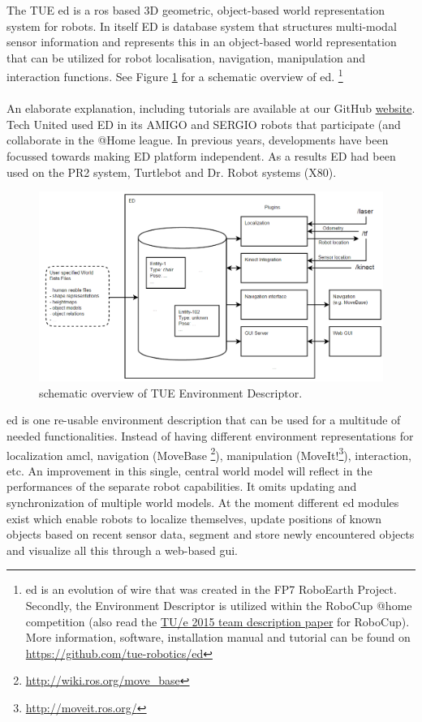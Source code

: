 The TUE \acrfull{ed} is a \acrfull{ros} based 3D geometric, object-based world representation system for robots. In itself ED is database system that structures multi-modal sensor information and represents this in an object-based world representation that can be utilized for robot localisation, navigation, manipulation and interaction functions. See Figure \ref{fig:ed} for a schematic overview of \acrshort{ed}. \footnote{\acrshort{ed} is an evolution of \acrfull{wire} that was created in the FP7 RoboEarth Project. Secondly, the Environment Descriptor is utilized within the RoboCup @home competition (also read the \href{https://github.com/tue-robotics/team_description_paper/blob/master/Tech_United_At_Home_TDP_2015.pdf}{TU/e 2015 team description paper} for RoboCup). More information,  software, installation manual and tutorial can be found on \url{https://github.com/tue-robotics/ed}}
\\\\
An elaborate explanation, including tutorials are available at our GitHub \href{http://github.com/tue-robotics}{website}. Tech United used ED in its AMIGO and SERGIO robots that participate (and collaborate in the @Home league. In previous years, developments have been focussed towards making ED platform independent. As a results ED had been used on the PR2 system, Turtlebot and Dr. Robot systems (X80).
\begin{figure}[ht]
	\includegraphics[width = \linewidth]{Figures/ed_overview}
	\caption{schematic overview of TUE Environment Descriptor.}
	\label{fig:ed}
\end{figure}
\acrshort{ed} is one re-usable environment description that can be used for a multitude of needed functionalities. Instead of having different environment representations for localization \acrfull{amcl}, navigation (MoveBase \footnote{\url{http://wiki.ros.org/move_base}}), manipulation (MoveIt!\footnote{\url{http://moveit.ros.org/}}), interaction, etc. An improvement in this single, central world model will reflect in the performances of the separate robot capabilities. It omits updating and synchronization of multiple world models. At the moment different \acrshort{ed} modules exist which enable robots to localize themselves, update positions of known objects based on recent sensor data, segment and store newly encountered objects and visualize all this through a web-based \acrshort{gui}.
